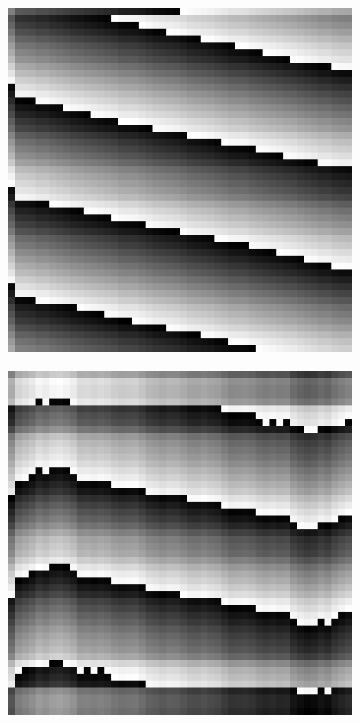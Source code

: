 \begin{figure}[htpb]
\begin{subfigure}{.25\textwidth}
\end{subfigure}
\quad
\begin{subfigure}{.25\textwidth}
\includegraphics[width=1\textwidth]{img/PhaseDifferenceRank1Sigma0}
\end{subfigure}%
\begin{subfigure}{.25\textwidth}
\includegraphics[width=1\textwidth]{img/PhaseDifferenceRank1Sigma75}

\end{subfigure}
\end{figure}
